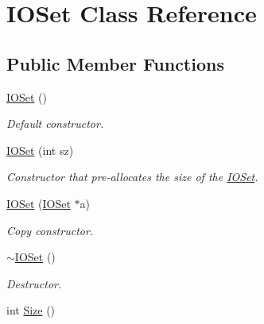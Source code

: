 \hypertarget{class_i_o_set}{
\section{IOSet Class Reference}
\label{class_i_o_set}
}
\subsection*{Public Member Functions}
\begin{DoxyCompactItemize}
\item 
\hypertarget{class_i_o_set_abdbbcdcb45f79251f492e0ad97a45706}{
\hyperlink{class_i_o_set_abdbbcdcb45f79251f492e0ad97a45706}{IOSet} ()}
\label{class_i_o_set_abdbbcdcb45f79251f492e0ad97a45706}

\begin{DoxyCompactList}\small\item\em Default constructor. \item\end{DoxyCompactList}\item 
\hypertarget{class_i_o_set_a134dbafdf32adadb409a786e1f23c9d7}{
\hyperlink{class_i_o_set_a134dbafdf32adadb409a786e1f23c9d7}{IOSet} (int sz)}
\label{class_i_o_set_a134dbafdf32adadb409a786e1f23c9d7}

\begin{DoxyCompactList}\small\item\em Constructor that pre-\/allocates the size of the \hyperlink{class_i_o_set}{IOSet}. \item\end{DoxyCompactList}\item 
\hypertarget{class_i_o_set_a30b5f06491792abcffbae5aa217096d4}{
\hyperlink{class_i_o_set_a30b5f06491792abcffbae5aa217096d4}{IOSet} (\hyperlink{class_i_o_set}{IOSet} $\ast$a)}
\label{class_i_o_set_a30b5f06491792abcffbae5aa217096d4}

\begin{DoxyCompactList}\small\item\em Copy constructor. \item\end{DoxyCompactList}\item 
\hypertarget{class_i_o_set_a4f919f20d760efdc02ad2d4ac044eaba}{
\hyperlink{class_i_o_set_a4f919f20d760efdc02ad2d4ac044eaba}{$\sim$IOSet} ()}
\label{class_i_o_set_a4f919f20d760efdc02ad2d4ac044eaba}

\begin{DoxyCompactList}\small\item\em Destructor. \item\end{DoxyCompactList}\item 
\hypertarget{class_i_o_set_a384b704b09e77138e99ef914d69995e0}{
int \hyperlink{class_i_o_set_a384b704b09e77138e99ef914d69995e0}{Size} ()}
\label{class_i_o_set_a384b704b09e77138e99ef914d69995e0}


\end{DoxyCompactItemize}
